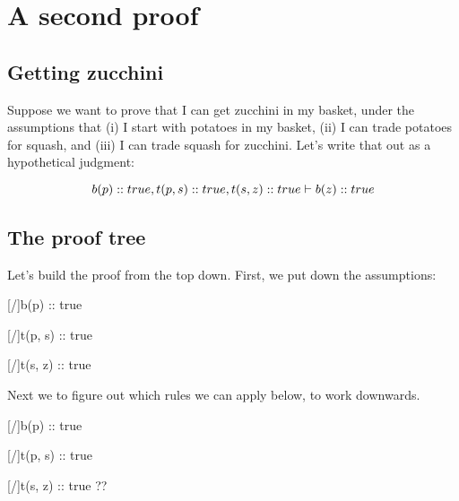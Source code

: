 \documentclass[../../../main.tex]{subfiles}
\begin{document}
\chapter{A second proof}


\section{Getting zucchini}

Suppose we want to prove that I can get zucchini in my basket, under the assumptions that (i) I start with potatoes in my basket, (ii) I can trade potatoes for squash, and (iii) I can trade squash for zucchini. Let's write that out as a hypothetical judgment:

\begin{equation*}
  b(p) :: true, t(p, s) :: true, t(s, z) :: true \ndturnstile/ b(z) :: true
\end{equation*}


\section{The proof tree}

Let's build the proof from the top down. First, we put down the assumptions:

\begin{prooftree*}
  \hypo{}
  [\startrule/]{b(p) :: true}

  \hypo{}
  [\startrule/]{t(p, s) :: true}
  
  \hypo{}
  [\startrule/]{t(s, z) :: true}
  
  
\end{prooftree*}

\noindent
Next we to figure out which rules we can apply below, to work downwards. 

\begin{prooftree*}
  \hypo{}
  [\startrule/]{b(p) :: true}
  \ellipsis{}{}

  \hypo{}
  [\startrule/]{t(p, s) :: true}
  \ellipsis{}{}
  
  \hypo{}
  [\startrule/]{t(s, z) :: true}
  \ellipsis{}{}
  ??
  
  
\end{prooftree*}
\end{document}
